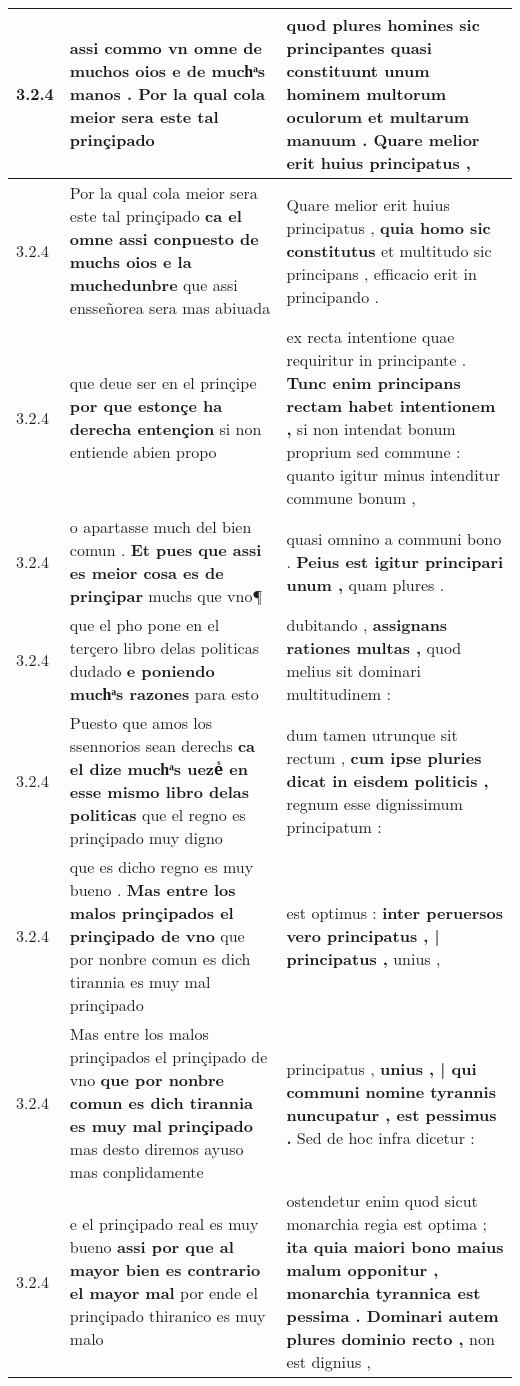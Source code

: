 \begin{tabular}{|p{1cm}|p{6.5cm}|p{6.5cm}|}
3.2.4 & assi commo vn omne de muchos oios \textbf{ e de muchͣs manos . } Por la qual cola meior sera este tal prinçipado & quod plures homines sic principantes \textbf{ quasi constituunt unum hominem multorum oculorum et multarum manuum . } Quare melior erit huius principatus , \\\hline
3.2.4 & Por la qual cola meior sera este tal prinçipado \textbf{ ca el omne assi conpuesto de muchs oios e la muchedunbre } que assi ensseñorea sera mas abiuada & Quare melior erit huius principatus , \textbf{ quia homo sic constitutus } et multitudo sic principans , efficacio erit in principando . \\\hline
3.2.4 & que deue ser en el prinçipe \textbf{ por que estonçe ha derecha entençion } si non entiende abien propo & ex recta intentione quae requiritur in principante . \textbf{ Tunc enim principans rectam habet intentionem , } si non intendat bonum proprium sed commune : quanto igitur minus intenditur commune bonum , \\\hline
3.2.4 & o apartasse much del bien comun . \textbf{ Et pues que assi es meior cosa es de prinçipar } muchs que vno¶ & quasi omnino a communi bono . \textbf{ Peius est igitur principari unum , } quam plures . \\\hline
3.2.4 & que el pho pone en el terçero libro delas politicas dudado \textbf{ e poniendo muchͣs razones } para esto & dubitando , \textbf{ assignans rationes multas , } quod melius sit dominari multitudinem : \\\hline
3.2.4 & Puesto que amos los ssennorios sean derechs \textbf{ ca el dize muchͣs uezeᷤ en esse mismo libro delas politicas } que el regno es prinçipado muy digno & dum tamen utrunque sit rectum , \textbf{ cum ipse pluries dicat in eisdem politicis , } regnum esse dignissimum principatum : \\\hline
3.2.4 & que es dicho regno es muy bueno . \textbf{ Mas entre los malos prinçipados el prinçipado de vno } que por nonbre comun es dich tirannia es muy mal prinçipado & est optimus : \textbf{ inter peruersos vero principatus , | principatus , } unius , \\\hline
3.2.4 & Mas entre los malos prinçipados el prinçipado de vno \textbf{ que por nonbre comun es dich tirannia es muy mal prinçipado } mas desto diremos ayuso mas conplidamente & principatus , \textbf{ unius , | qui communi nomine tyrannis nuncupatur , est pessimus . } Sed de hoc infra dicetur : \\\hline
3.2.4 & e el prinçipado real es muy bueno \textbf{ assi por que al mayor bien es contrario el mayor mal } por ende el prinçipado thiranico es muy malo & ostendetur enim quod sicut monarchia regia est optima ; \textbf{ ita quia maiori bono maius malum opponitur , monarchia tyrannica est pessima . Dominari autem plures dominio recto , } non est dignius , \\\hline

\end{tabular}
